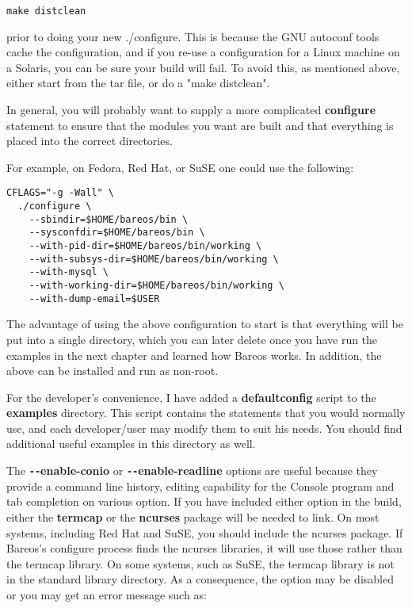 \footnotesize
\begin{verbatim}
make distclean
\end{verbatim}
\normalsize

prior to doing your new ./configure. This is because the GNU autoconf tools
cache the configuration, and if you re-use a configuration for a Linux machine
on a Solaris, you can be sure your build will fail. To avoid this, as
mentioned above, either start from the tar file, or do a "make distclean".

In general, you will probably want to supply a more complicated {\bf
configure} statement to ensure that the modules you want are built and that
everything is placed into the correct directories.

For example, on Fedora, Red Hat, or SuSE one could use the following:

\footnotesize
\begin{verbatim}
CFLAGS="-g -Wall" \
  ./configure \
    --sbindir=$HOME/bareos/bin \
    --sysconfdir=$HOME/bareos/bin \
    --with-pid-dir=$HOME/bareos/bin/working \
    --with-subsys-dir=$HOME/bareos/bin/working \
    --with-mysql \
    --with-working-dir=$HOME/bareos/bin/working \
    --with-dump-email=$USER
\end{verbatim}
\normalsize

The advantage of using the above configuration to start is that
everything will be put into a single directory, which you can later delete
once you have run the examples in the next chapter and learned how Bareos
works. In addition, the above can be installed and run as non-root.

For the developer's convenience, I have added a {\bf defaultconfig} script to
the {\bf examples} directory. This script contains the statements that you
would normally use, and each developer/user may modify them to suit his needs.
You should find additional useful examples in this directory as well.

The {\bf \verb:--:enable-conio} or {\bf \verb:--:enable-readline} options are
useful because they provide a command line history, editing capability for the
Console program and tab completion on various option. If you have included
either option in the build, either the {\bf termcap} or the {\bf ncurses}
package will be needed to link. On most systems, including Red Hat and SuSE,
you should include the ncurses package.  If Bareos's configure process finds
the ncurses libraries, it will use those rather than the termcap library.  On
some systems, such as SuSE, the termcap library is not in the standard library
directory.  As a consequence, the option may be disabled or you may get an
error message such as:

